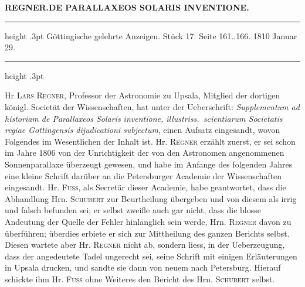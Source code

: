 \clearpage
\noindent{}%
\makebox[12mm][l]{}%
\parbox[t]{\dimexpr\linewidth-24mm\relax}{\centering\footnotesize\bfseries REGNER.\enspace DE PARALLAXEOS SOLARIS INVENTIONE.\par}%
\par\nobreak\medskip
\begin{center}
\parbox{.9\linewidth}{%
\centering\small
\hrule height .3pt\relax\vspace{2.5pt}
Göttingische gelehrte Anzeigen. Stück 17. Seite 161..166. 1810 Januar 29.\par
\vspace{2.5pt}\hrule height .3pt\relax
}
\end{center}
\par\nobreak\medskip

Hr \textsc{Lars Regner}, Professor der Astronomie zu Upsala, Mitglied der dortigen königl. Societät der Wissenschaften, hat unter der Ueberschrift: \emph{Supplementum ad historiam de Parallaxeos Solaris inventione, illustriss.\ scientiarum Societatis regiae Gottingensis dijudicationi subjectum}, einen Aufsatz eingesandt, wovon Folgendes im Wesentlichen der Inhalt ist. Hr. \textsc{Regner} erzählt zuerst, er sei schon im Jahre 1806 von der Unrichtigkeit der von den Astronomen angenommenen Sonnenparallaxe überzeugt gewesen, und habe im Anfange des folgenden Jahres eine kleine Schrift darüber an die Petersburger Academie der Wissenschaften eingesandt. Hr. \textsc{Fuss}, als Secretär dieser Academie, habe geantwortet, dass die Abhandlung Hrn. \textsc{Schubert} zur Beurtheilung übergeben und von diesem als irrig und falsch befunden sei; er selbst zweifle auch gar nicht, dass die blosse Andeutung der Quelle der Fehler hinlänglich sein werde, Hrn. \textsc{Regner} davon zu überführen; überdies erbiete er sich zur Mittheilung des ganzen Berichts selbst. Diesen wartete aber Hr. \textsc{Regner} nicht ab, sondern liess, in der Ueberzeugung, dass der angedeutete Tadel ungerecht sei, seine Schrift mit einigen Erläuterungen in Upsala drucken, und sandte sie dann von neuem nach Petersburg. Hierauf schickte ihm Hr. \textsc{Fuss} ohne Weiteres den Bericht des Hrn. \textsc{Schubert} selbst.

